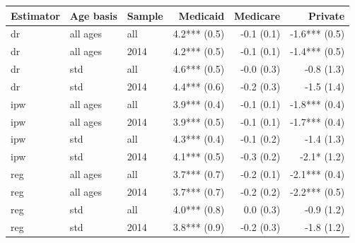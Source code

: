 \begin{tabular}{@{}lll rrr@{}}
\toprule
Estimator & Age basis & Sample & Medicaid & Medicare & Private \\
\midrule
dr & all ages & all & 4.2*** (0.5) & -0.1 (0.1) & -1.6*** (0.5) \\
dr & all ages & 2014 & 4.2*** (0.5) & -0.1 (0.1) & -1.4*** (0.5) \\
dr & std & all & 4.6*** (0.5) & -0.0 (0.3) & -0.8 (1.3) \\
dr & std & 2014 & 4.4*** (0.6) & -0.2 (0.3) & -1.5 (1.4) \\
ipw & all ages & all & 3.9*** (0.4) & -0.1 (0.1) & -1.8*** (0.4) \\
ipw & all ages & 2014 & 3.9*** (0.5) & -0.1 (0.1) & -1.7*** (0.4) \\
ipw & std & all & 4.3*** (0.4) & -0.1 (0.2) & -1.4 (1.3) \\
ipw & std & 2014 & 4.1*** (0.5) & -0.3 (0.2) & -2.1* (1.2) \\
reg & all ages & all & 3.7*** (0.7) & -0.2 (0.1) & -2.1*** (0.4) \\
reg & all ages & 2014 & 3.7*** (0.7) & -0.2 (0.2) & -2.2*** (0.5) \\
reg & std & all & 4.0*** (0.8) & 0.0 (0.3) & -0.9 (1.2) \\
reg & std & 2014 & 3.8*** (0.9) & -0.2 (0.3) & -1.8 (1.2) \\
\bottomrule
\end{tabular}
